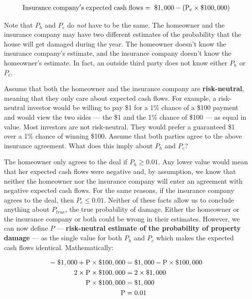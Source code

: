 \documentclass{jss}
\begin{document}
\begin{equation}
 \begin{aligned}
   {\rm Insurance\hspace{3pt}company's\hspace{3pt}expected\hspace{3pt}cash\hspace{3pt}flows = \hspace{3pt}\$1,000 - (P_c \times {\$100,000})}
    \end{aligned}
    \label{eqn:companyECF}
\end{equation}

Note that $P_h$ and $P_c$ do \emph{not} have to be the same. The homeowner and the insurance company may have two different estimates of the probability that the house will get damaged during the year. The homeowner doesn't know the insurance company's estimate, and the insurance company doesn't know the homeowner's estimate. In fact, an outside third party does not know either $P_h$ or $P_c$. 

Assume that both the homeowner and the insurance company are \textbf{risk-neutral}, meaning that they only care about expected cash flows. For example, a risk-neutral investor would be willing to pay \$1 for a 1\% chance of a \$100 payment and would view the two sides --- the \$1 and the 1\% chance of \$100 --- as equal in value. Most investors are not risk-neutral. They would prefer a guaranteed \$1 over a 1\% chance of winning \$100. Assume that both parties agree to the above insurance agreement. What does this imply about $P_h$ and $P_c$? 

The homeowner only agrees to the deal if $P_h \geq 0.01$. Any lower value would mean that her expected cash flows were negative and, by assumption, we know that neither the homeowner nor the insurance company will enter an agreement with negative expected cash flows. For the same reasons, if the insurance company agrees to the deal, then $P_c \leq 0.01$. Neither of these facts allow us to conclude anything about $P_{true}$, the true probability of damage. Either the homeowner or the insurance company or both could be wrong in their estimates. However, we can now define $P$ --- \textbf{risk-neutral estimate of the probability of property damage} --- as the single value for both $P_h$ and $P_c$ which makes the expected cash flows identical. Mathematically:

\label{eqn:PropertyInsurance}
\begin{align}
  \rm -\hspace{3pt}\$1,000 + P \times {\$100,000}  &= \rm \$1,000 - P \times {\$100,000} \\
  \rm 2 \times P \times {\$100,000}  &=  \rm 2 \times \$1,000 \\
  \rm P \times {\$100,000}  &= \rm {\$1,000} \\
  \rm P  &= \rm 0.01
\end{align}
\end{document}
